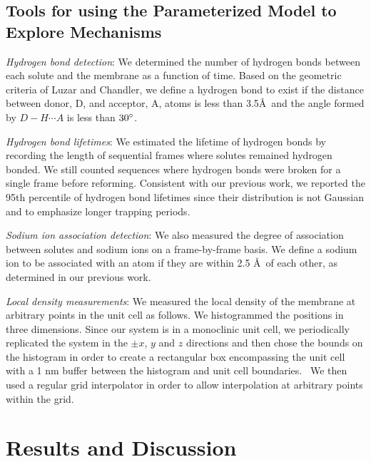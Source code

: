 \documentclass[journal=jpcbfk,manuscript=article]{achemso}
\begin{document}
  \subsection{Tools for using the Parameterized Model to Explore Mechanisms}\label{method:interactions}
  
  \textit{Hydrogen bond detection}: We determined the number of hydrogen bonds 
  between each solute and the membrane as a function of time. Based on the 
  geometric criteria of Luzar and Chandler, we define a hydrogen bond to exist 
  if the distance between donor, D, and acceptor, A, atoms is less than 
  3.5\AA~and the angle formed by $D-H \cdots A$ is less than $30\degree$.~\cite{luzar_effect_1996}
  
  \textit{Hydrogen bond lifetimes}: We estimated the lifetime of hydrogen bonds by 
  recording the length of sequential frames where solutes remained hydrogen bonded.
  We still counted sequences where hydrogen bonds were broken for a single frame 
  before reforming. Consistent with our previous work, we reported the 95th 
  percentile of hydrogen bond lifetimes since their distribution is not Gaussian
  and to emphasize longer trapping periods.~\cite{coscia_chemically_2019}
  
  \textit{Sodium ion association detection}: We also measured the degree of association
  between solutes and sodium ions on a frame-by-frame basis. We define a sodium ion to
  be associated with an atom if they are within 2.5 \AA~of each other, as determined 
  in our previous work.~\cite{coscia_chemically_2019}
  
  \textit{Local density measurements}: We measured the local density of the membrane at
  arbitrary points in the unit cell as follows. We histogrammed the positions in three 
  dimensions. Since our system is in a monoclinic unit cell, we periodically replicated
  the system in the $\pm x$, $y$ and $z$ directions and then chose the bounds on the
  histogram in order to create a rectangular box encompassing the unit cell with
  a 1 nm buffer between the histogram and unit cell boundaries.~\cite{van_der_walt_numpy_2011}
  We then used a regular grid interpolator in order to allow interpolation at arbitrary
  points within the grid.~\cite{virtanen_scipy_2020} 

  \section{Results and Discussion}
  
\end{document}
